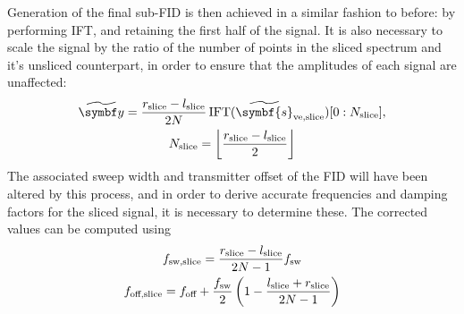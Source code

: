 Generation of the final sub-\ac{FID} is then achieved in a similar fashion to
before: by performing \ac{IFT}, and retaining the first half of the signal.
It is also necessary to scale the signal by the ratio of the number of points
in the sliced spectrum and it's unsliced counterpart, in order to ensure that
the amplitudes of each signal are unaffected:
\begin{subequations}
    \begin{gather}
        \widetilde{\by} =
            \frac{r_{\text{slice}} - l_{\text{slice}}}{2N}
            \IFT(\widetilde{\symbf{s}}_{\text{ve,slice}})
            [0 : N_{\text{slice}}],\\
            N_{\text{slice}} = \left \lfloor \frac{r_{\text{slice}} - l_{\text{slice}}}{2} \right \rfloor
    \end{gather}
\end{subequations}
The associated sweep width and transmitter offset of the \ac{FID} will have
been altered by this process, and in order to derive accurate frequencies and
damping factors for the sliced signal, it is necessary to determine these. The
corrected values can be computed using
\begin{subequations}
    \begin{gather}
        f_{\text{sw,slice}} = \frac{r_{\text{slice}} - l_{\text{slice}}}{2N - 1} f_{\mathrm{sw}}\\
        f_{\text{off,slice}} = f_{\text{off}} + \frac{f_{\mathrm{sw}}}{2} \left(
            1 - \frac{l_{\text{slice}} + r_{\text{slice}}}{2N - 1}
        \right)
    \end{gather}
\end{subequations}

